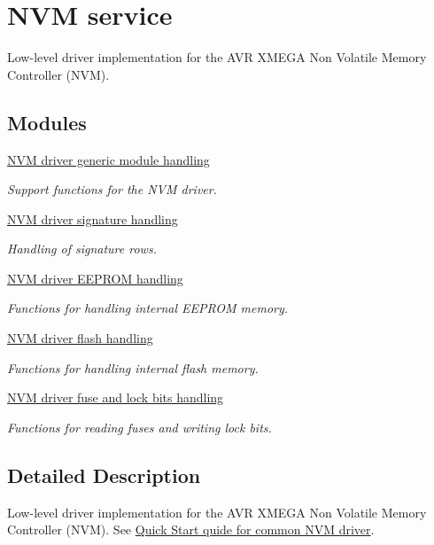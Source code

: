 \hypertarget{group__nvm__group}{\section{N\-V\-M service}
\label{group__nvm__group}
}


Low-\/level driver implementation for the A\-V\-R X\-M\-E\-G\-A Non Volatile Memory Controller (N\-V\-M).  


\subsection*{Modules}
\begin{DoxyCompactItemize}
\item 
\hyperlink{group__nvm__generic__group}{N\-V\-M driver generic module handling}
\begin{DoxyCompactList}\small\item\em Support functions for the N\-V\-M driver. \end{DoxyCompactList}\item 
\hyperlink{group__nvm__signature__group}{N\-V\-M driver signature handling}
\begin{DoxyCompactList}\small\item\em Handling of signature rows. \end{DoxyCompactList}\item 
\hyperlink{group__nvm__eeprom__group}{N\-V\-M driver E\-E\-P\-R\-O\-M handling}
\begin{DoxyCompactList}\small\item\em Functions for handling internal E\-E\-P\-R\-O\-M memory. \end{DoxyCompactList}\item 
\hyperlink{group__nvm__flash__group}{N\-V\-M driver flash handling}
\begin{DoxyCompactList}\small\item\em Functions for handling internal flash memory. \end{DoxyCompactList}\item 
\hyperlink{group__nvm__fuse__lock__group}{N\-V\-M driver fuse and lock bits handling}
\begin{DoxyCompactList}\small\item\em Functions for reading fuses and writing lock bits. \end{DoxyCompactList}\end{DoxyCompactItemize}


\subsection{Detailed Description}
Low-\/level driver implementation for the A\-V\-R X\-M\-E\-G\-A Non Volatile Memory Controller (N\-V\-M). See \hyperlink{common_nvm_quickstart}{Quick Start quide for common N\-V\-M driver}.

